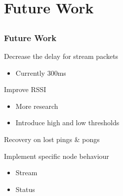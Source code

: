 \section{Future Work}
\subsection*{}


\begin{frame}[t]
  \frametitle{Future Work}
  Decrease the delay for stream packets
  \begin{itemize}
  \item Currently 300ms
  \end{itemize}
  
  \vfill
  
  Improve RSSI
  \begin{itemize}
    \item More research
    \item Introduce high and low thresholds
  \end{itemize}

  \vfill

  Recovery on lost pings & pongs
  
  \vfill
  
  Implement specific node behaviour
  \begin{itemize}
    \item Stream
    \item Status
  \end{itemize}

\end{frame}
